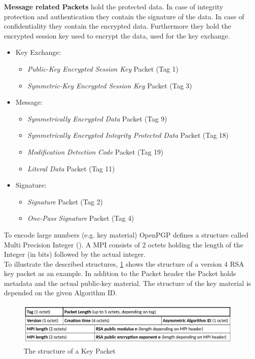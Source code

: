\textbf{Message related Packets} hold the protected data. In case of integrity protection and authentication they contain the signature of the data. In case of confidentiality they contain the encrypted data.
Furthermore they hold the encrypted session key used to encrypt the data, used for the key exchange.

\begin{itemize}
	\item Key Exchange:
	\begin{itemize}
		\item \textit{Public-Key Encrypted Session Key} Packet (Tag 1)
		\item \textit{Symmetric-Key Encrypted Session Key} Packet (Tag 3)
	\end{itemize}
	
	\item Message:
	\begin{itemize}
		\item \textit{Symmetrically Encrypted Data} Packet (Tag 9)
		\item \textit{Symmetrically Encrypted Integrity Protected Data} Packet (Tag 18)
		\item \textit{Modification Detection Code} Packet (Tag 19)
		\item \textit{Literal Data} Packet (Tag 11)
	\end{itemize}
	
	\item Signature:
	\begin{itemize}
		\item \textit{Signature} Packet (Tag 2)
		\item \textit{One-Pass Signature} Packet (Tag 4)
	\end{itemize}
\end{itemize}

To encode large numbers (e.g. key material) OpenPGP defines a structure called Multi Precision Integer (). A MPI consists of 2 octets holding the length of the Integer (in bits) followed by the actual integer. \\


To illustrate the described structures, \ref{fig:packet-key} shows the structure of a version 4 RSA key packet as an example. In addition to the Packet header the Packet holds metadata and the actual public-key material. The structure of the key material is depended on the given Algorithm ID.

\begin{figure}[h!]
\centering
\includegraphics[width=1\linewidth]{figures/packet-key.png}
\caption[]{The structure of a Key Packet}
\label{fig:packet-key}
\end{figure}

